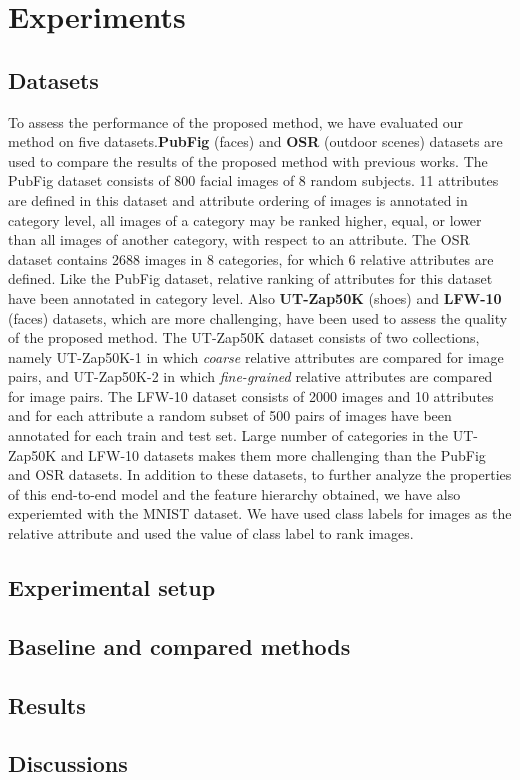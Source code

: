 

\section{Experiments}

\subsection{Datasets}
To assess the performance of the proposed method, we have evaluated our method on five datasets.\;\textbf{PubFig} \cite{pubfig} (faces) and \textbf{OSR} \cite{oliva2001modeling} (outdoor scenes) datasets are used to compare the results of the proposed method with previous works. The PubFig dataset consists of 800 facial images of 8 random subjects. 11 attributes are defined in this dataset and attribute ordering of images is annotated in category level, \ie all images of a category may be ranked higher, equal, or lower than all images of another category, with respect to an attribute. The OSR dataset contains 2688 images in 8 categories, for which 6 relative attributes are defined. Like the PubFig dataset, relative ranking of attributes for this dataset have been annotated in category level.
Also \textbf{UT-Zap50K} \cite{Yu2014} (shoes) and \textbf{LFW-10} \cite{Sandeep_2014_CVPR} (faces) datasets, which are more challenging, have been used to assess the quality of the proposed method. The UT-Zap50K dataset consists of two collections, namely UT-Zap50K-1 in which \textit{coarse} relative attributes are compared for image pairs, and UT-Zap50K-2 in which \textit{fine-grained} relative attributes are compared for image pairs. The LFW-10 dataset consists of 2000 images and 10 attributes and for each attribute a random subset of 500 pairs of images have been annotated for each train and test set. Large number of categories in the UT-Zap50K and LFW-10 datasets makes them more challenging than the PubFig and OSR datasets. In addition to these datasets, to further analyze the properties of this end-to-end model and the feature hierarchy obtained, we have also experiemted with the MNIST \cite{lecun1998mnist} dataset. We have used class labels for images as the relative attribute and used the value of class label to rank images.
\subsection{Experimental setup}
\subsection{Baseline and compared methods}
\subsection{Results}
\subsection{Discussions}

